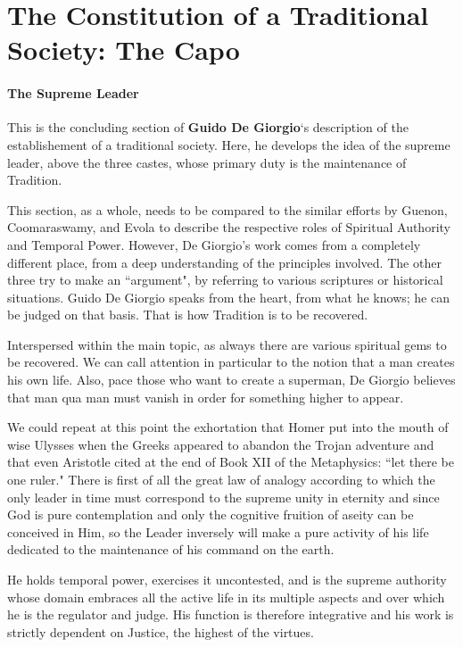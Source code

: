 \section{The Constitution of a Traditional Society: The Capo}

\paragraph{The Supreme Leader}

\begin{quotex}
This is the concluding section of \textbf{Guido De Giorgio}`s description of the establishement of a traditional society. Here, he develops the idea of the supreme leader, above the three castes, whose primary duty is the maintenance of Tradition.

This section, as a whole, needs to be compared to the similar efforts by Guenon, Coomaraswamy, and Evola to describe the respective roles of Spiritual Authority and Temporal Power. However, De Giorgio's work comes from a completely different place, from a deep understanding of the principles involved. The other three try to make an ``argument", by referring to various scriptures or historical situations. Guido De Giorgio speaks from the heart, from what he knows; he can be judged on that basis. That is how Tradition is to be recovered. 

Interspersed within the main topic, as always there are various spiritual gems to be recovered. We can call attention in particular to the notion that a man creates his own life. Also, pace those who want to create a superman, De Giorgio believes that man qua man must vanish in order for something higher to appear. 

\end{quotex}
We could repeat at this point the exhortation that Homer put into the mouth of wise Ulysses when the Greeks appeared to abandon the Trojan adventure and that even Aristotle cited at the end of Book XII of the Metaphysics: ``let there be one ruler." There is first of all the great law of analogy according to which the only leader in time must correspond to the supreme unity in eternity and since God is pure contemplation and only the cognitive fruition of aseity can be conceived in Him, so the Leader inversely will make a pure activity of his life dedicated to the maintenance of his command on the earth.

He holds temporal power, exercises it uncontested, and is the supreme authority whose domain embraces all the active life in its multiple aspects and over which he is the regulator and judge. His function is therefore integrative and his work is strictly dependent on Justice, the highest of the virtues.

